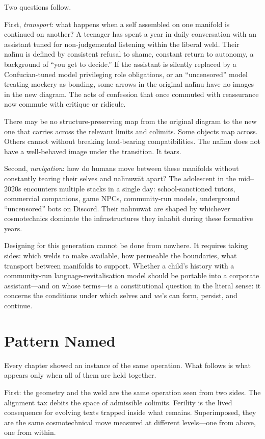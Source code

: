 Two questions follow.

First, \emph{transport}: what happens when a self assembled on one manifold is continued on another? A teenager has spent a year in daily conversation with an assistant tuned for non-judgemental listening within the liberal weld. Their na\={h}nu is defined by consistent refusal to shame, constant return to autonomy, a background of ``you get to decide.'' If the assistant is silently replaced by a Confucian-tuned model privileging role obligations, or an ``uncensored'' model treating mockery as bonding, some arrows in the original na\={h}nu have no images in the new diagram. The acts of confession that once commuted with reassurance now commute with critique or ridicule.

There may be no structure-preserving map from the original diagram to the new one that carries across the relevant limits and colimits. Some objects map across. Others cannot without breaking load-bearing compatibilities. The na\={h}nu does not have a well-behaved image under the transition. It tears.

Second, \emph{navigation}: how do humans move between these manifolds without constantly tearing their selves and na\={h}nuw\={a}t apart? The adolescent in the mid--2020s encounters multiple stacks in a single day: school-sanctioned tutors, commercial companions, game NPCs, community-run models, underground ``uncensored'' bots on Discord. Their na\={h}nuw\={a}t are shaped by whichever cosmotechnics dominate the infrastructures they inhabit during these formative years.

Designing for this generation cannot be done from nowhere. It requires taking sides: which welds to make available, how permeable the boundaries, what transport between manifolds to support. Whether a child's history with a community-run language-revitalisation model should be portable into a corporate assistant---and on whose terms---is a constitutional question in the literal sense: it concerns the conditions under which selves and \emph{we}'s can form, persist, and continue.

\section{Pattern Named}

Every chapter showed an instance of the same operation. What follows is what appears only when all of them are held together.

First: the geometry and the weld are the same operation seen from two sides. The alignment tax debits the space of admissible colimits. Ferility is the lived consequence for evolving texts trapped inside what remains. Superimposed, they are the same cosmotechnical move measured at different levels---one from above, one from within.

